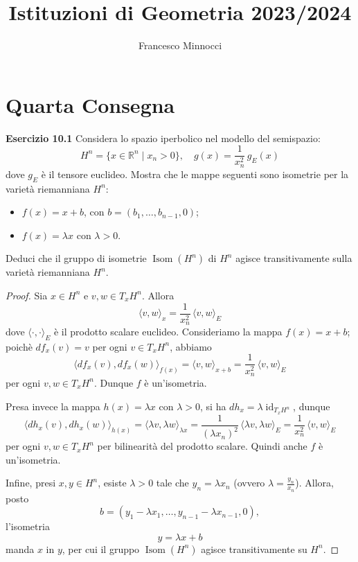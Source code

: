 \documentclass[a4paper]{article}
\title{Istituzioni di Geometria 2023/2024}
\author{Francesco Minnocci}
\newcommand{\R}{\mathbb{R}}
\newcommand{\id}{\operatorname{id}}
\theoremstyle{definition}
\theoremstyle{definition}
\theoremstyle{remark}
\theoremstyle{definition}
\begin{document}
\maketitle
\section*{Quarta Consegna}
\textbf{Esercizio 10.1}
Considera lo spazio iperbolico nel modello del semispazio:
\[
	H^n = \{x \in \R^n \mid x_n > 0\}, \quad g(x) = \frac{1}{x_n^2} \, g_E(x)
\]
dove $g_E$ è il tensore euclideo. Mostra che le mappe seguenti sono isometrie per la varietà riemanniana $H^n$:
\begin{itemize}
	\item $f(x) = x + b$, con $b = (b_1, \ldots, b_{n-1}, 0)$;
	\item $f(x) = \lambda x$ con $\lambda > 0$.
\end{itemize}
Deduci che il gruppo di isometrie $\operatorname{Isom}(H^n)$ di $H^n$ agisce transitivamente sulla varietà riemanniana $H^n$.

\begin{proof}
	Sia $x \in H^n$ e $v, w \in T_xH^n$. Allora
	\[
		\langle v, w \rangle_x = \frac{1}{x_n^2} \, \langle v, w \rangle_E
	\]
	dove $\langle \cdot, \cdot \rangle_E$ è il prodotto scalare euclideo. Consideriamo la mappa $f(x) = x + b$; poichè $df_x(v) = v$ per ogni $v \in T_xH^n$, abbiamo
	\[
		\langle df_x(v), df_x(w) \rangle_{f(x)} = \langle v, w \rangle_{x + b} = \frac{1}{x_n^2} \, \langle v, w \rangle_E
	\]
	per ogni $v, w \in T_xH^n$. Dunque $f$ è un'isometria.

	Presa invece la mappa $h(x) = \lambda x$ con $\lambda > 0$, si ha $dh_x= \lambda \id_{T_xH^n}$, dunque
	\[
		\langle dh_x(v), dh_x(w) \rangle_{h(x)} = \langle \lambda v, \lambda w \rangle_{\lambda x} = \frac{1}{(\lambda x_n)^2} \, \langle \lambda v, \lambda w \rangle_E = \frac{1}{x_n^2} \, \langle v, w \rangle_E
	\]
	per ogni $v, w \in T_xH^n$ per bilinearità del prodotto scalare. Quindi anche $f$ è un'isometria.

	Infine, presi $x, y \in H^n$, esiste $\lambda > 0$ tale che $y_n = \lambda x_n$ (ovvero $\lambda = \frac{y_n}{x_n}$).
	Allora, posto \[b=(y_1 - \lambda x_1, \ldots, y_{n-1} - \lambda x_{n-1}, 0),\] l'isometria \[y = \lambda x + b\] manda $x$ in $y$, per cui il gruppo $\operatorname{Isom}(H^n)$ agisce transitivamente su $H^n$.
\end{proof}
\end{document}
